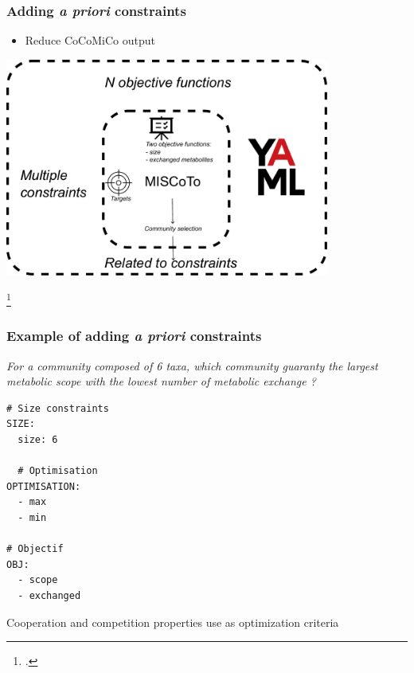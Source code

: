 \documentclass[8pt,usenames,dvipsnames]{beamer}
\begin{document}
\begin{frame}
\frametitle{Adding \textit{a priori} constraints}

\begin{itemize}
\item Reduce CoCoMiCo output 
\end{itemize}
\centering
\includegraphics[width=0.8\textwidth]{figures/enrichissement.pdf}

\footcite{Frioux2018}
\end{frame}

\begin{frame}[fragile]
\frametitle{Example of adding \textit{a priori} constraints}

\textit{For a community composed of 6 taxa, which community guaranty the largest metabolic scope with the lowest number of metabolic exchange ?}
\begin{lstlisting}[style=yaml]
# Size constraints
SIZE:
  size: 6
  
  # Optimisation
OPTIMISATION: 
  - max
  - min

# Objectif
OBJ:
  - scope
  - exchanged
\end{lstlisting}

\begin{alertblock}{}
Cooperation and competition properties use as optimization criteria
\end{alertblock}
\end{frame}
\end{document}
